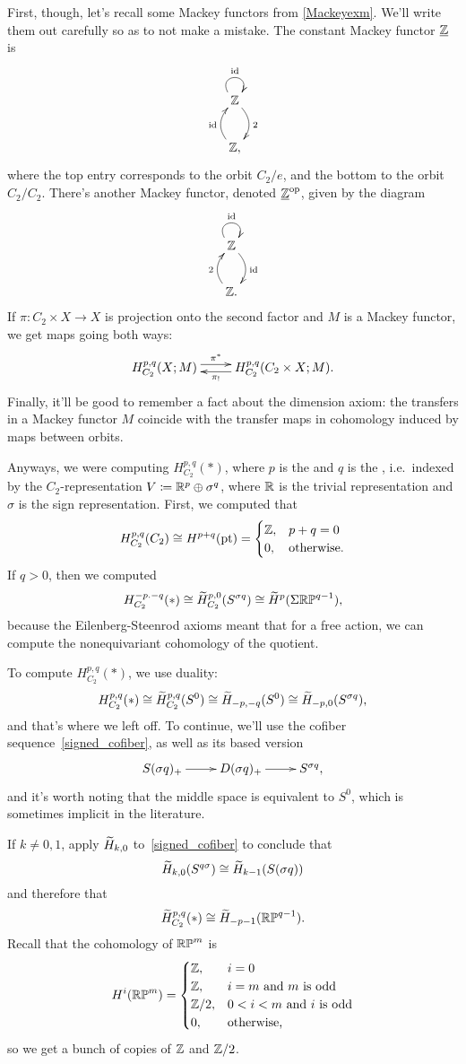First, though, let's recall some Mackey functors from \cref{Mackeyexm}. We'll write them out carefully so as to not
make a mistake. The constant Mackey functor $\underline{\mathbb Z}$ is
\[\xymatrix{
	\Z\ar@/^0.4cm/[d]^2\ar@(ul,ur)^\id\\
	\Z,\ar@/^0.4cm/[u]^\id
}\]
where the top entry corresponds to the orbit $C_2/e$, and the bottom to the orbit $C_2/C_2$. There's another Mackey
functor, denoted $\underline{\mathbb Z}^{\mathrm{op}}$, given by the diagram
\[\xymatrix{
	\Z\ar@/^0.4cm/[d]^\id\ar@(ul,ur)^\id\\
	\Z.\ar@/^0.4cm/[u]^2
}\]
If $\pi\colon C_2\times X\to X$ is projection onto the second factor and $M$ is a Mackey functor, we get maps going
both ways:
\[\xymatrix{
	H_{C_2}^{p,q}(X;M)\ar@<0.1cm>[r]^-{\pi^*} & H_{C_2}^{p,q}(C_2\times X; M).\ar@<0.1cm>[l]^-{\pi_!}
}\]
Finally, it'll be good to remember a fact about the dimension axiom: the transfers in a Mackey functor $M$ coincide
with the transfer maps in cohomology induced by maps between orbits.

Anyways, we were computing $H_{C_2}^{p,q}(*)$, where $p$ is the  and $q$ is the , i.e.\ indexed by the $C_2$-representation $V \coloneqq \mathbb R^p\oplus\sigma^q$, where $\mathbb R$ is the trivial
representation and $\sigma$ is the sign representation. First, we computed that
\[H_{C_2}^{p,q}(C_2)\cong H^{p+q}(\mathrm{pt}) = \begin{cases}
	\mathbb Z, &p+q = 0\\
	0, &\text{otherwise.}
\end{cases}\]
If $q > 0$, then we computed
\[H^{-p.-q}_{C_2}(*) \cong \widetilde H_{C_2}^{p,0}(S^{\sigma q})\cong\widetilde H^p(\Sigma\mathbb{RP}^{q-1}),\]
because the Eilenberg-Steenrod axioms meant that for a free action, we can compute the nonequivariant cohomology of
the quotient.

To compute $H_{C_2}^{p,q}(*)$, we use duality:
\[H_{C_2}^{p,q}(*) \cong \widetilde H^{p,q}_{C_2}(S^0)\cong \widetilde H_{-p,-q}(S^0)\cong \widetilde H_{-p,0}(S^{\sigma q}),\]
and that's where we left off. To continue, we'll use the cofiber sequence~\eqref{signed_cofiber}, as well as its
based version
\begin{equation}
\label{based_signed}
\xymatrix{
	S(\sigma q)_+\ar[r] & D(\sigma q)_+\ar[r] & S^{\sigma q},
}
\end{equation}
and it's worth noting that the middle space is equivalent to $S^0$, which is sometimes implicit in the literature.

If $k\ne 0,1$, apply $\widetilde H_{k,0}$ to~\eqref{signed_cofiber} to conclude that
\[\widetilde H_{k,0}(S^{q\sigma})\cong \widetilde H_{k-1}(S(\sigma q))\]
and therefore that
\[\widetilde H_{C_2}^{p,q}(*)\cong \widetilde H_{-p-1}(\mathbb{RP}^{q-1}).\]
Recall that the cohomology of $\mathbb{RP}^m$ is
\[H^i(\mathbb{RP}^m) = \begin{cases}
	\mathbb Z, &i = 0\\
	\mathbb Z, &i = m\text{ and $m$ is odd}\\
	\mathbb Z/2, &0 < i < m\text{ and $i$ is odd}\\
	0, &\text{otherwise,}
\end{cases}\]
so we get a bunch of copies of $\mathbb Z$ and $\mathbb Z/2$.

